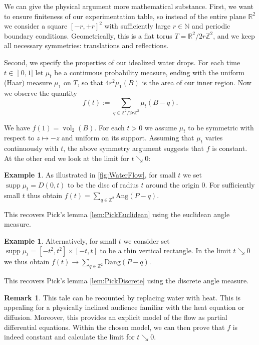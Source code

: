 \documentclass[a4paper]{amsart}
\numberwithin{equation}{section}
\theoremstyle{plain}
\theoremstyle{definition}
\newtheorem{remark}[theorem]{Remark}
\newtheorem{example}[theorem]{Example}
\newcommand{\N}{\mathbb{N}}
\newcommand{\Z}{\mathbb{Z}}
\newcommand{\R}{\mathbb{R}}
\newcommand{\ei}[2]{\mathopen] #1, #2 \mathclose]}
\DeclareMathOperator{\vol}{vol}
\DeclareMathOperator{\supp}{supp}
\newcommand{\Ang}{\mathrm{Ang}}
\newcommand{\Dang}{\mathrm{Dang}}
\begin{document}
We can give the physical argument more mathematical substance.
%
First, we want to ensure finiteness of our experimentation table,
so instead of the entire plane $\R^2$ we consider a square $[-r,+r]^2$
with sufficiently large $r \in \N$ and periodic boundary conditions.
Geometrically, this is a flat torus $T = \R^2 / 2r\Z^2$,
and we keep all necessary symmetries: translations and reflections.

Second, we specify the properties of our idealized water drops.
For each time $t \in \ei{0}{1}$ let $\mu_t$ be a continuous probability measure,
ending with the uniform (Haar) measure $\mu_1$ on $T$,
so that $4 r^2 \mu_1(B)$ is the area of our inner region. 
Now we observe the quantity 
\[
f(t) := \sum_{q \in \Z^2/2r\Z^2} \mu_t(B-q) .
\]

We have $f(1) = \vol_2(B)$.
For each $t > 0$ we assume $\mu_t$ to be symmetric
with respect to $z \mapsto -z$ and uniform on its support.
Assuming that $\mu_t$ varies continuously with $t$,
the above symmetry argument suggests that $f$ is constant.
At the other end we look at the limit for $t \searrow 0$:

\begin{example}
  As illustrated in \autoref{fig:WaterFlow}, for small $t$ %
  we set $\supp \mu_t = D(0,t)$ to be the disc of radius $t$ around the origin $0$.
  For sufficiently small $t$ thus obtain $f(t) = \sum_{q \in \Z^2} \Ang(P-q)$.

  This recovers Pick's lemma \ref{lem:PickEuclidean}
  using the euclidean angle measure.
\end{example}

\begin{example}
  Alternatively, for small $t$ %
  we consider set $\supp \mu_t = [-t^2,t^2] \times [-t,t]$
  to be a thin vertical rectangle.
  In the limit $t \searrow 0$ we thus obtain
  $f(t) \to \sum_{q \in \Z^2} \Dang(P-q)$.

  This recovers Pick's lemma \ref{lem:PickDiscrete}
  using the discrete angle measure.
\end{example}

\begin{remark}
  This tale can be recounted by replacing water with heat.
  This is appealing for a physically inclined audience
  familiar with the heat equation or diffusion.
  Moreover, this provides an explicit model of the flow
  as partial differential equations.
  Within the chosen model, we can then 
  prove that $f$ is indeed constant
  and calculate the limit for $t \searrow 0$.
\end{remark}
\end{document}

